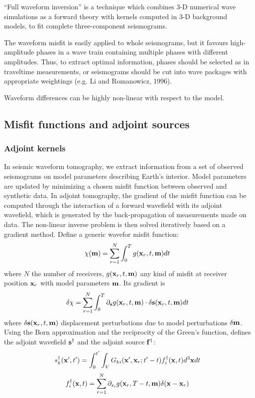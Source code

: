  ``Full waveform inversion'' is a technique
which combines 3-D numerical wave simulations as a forward theory
with \Frechet kernels computed in 3-D background models,
to fit complete three-component seismograms.

 The waveform misfit is easily applied to whole seismograms,
but it favours high-amplitude phases in a wave train
containing multiple phases with different amplitudes.
Thus, to extract optimal information, phases should be selected as in traveltime measurements,
or seismograms should be cut into wave packages with appropriate weightings
(e.g. Li and Romanowicz, 1996).

Waveform differences can be highly non-linear with respect to the model.

\subsection{Misfit functions and adjoint sources}
\subsubsection{Adjoint kernels}
 In seismic waveform tomography, we extract information from
a set of observed seismograms on model parameters describing Earth's interior.
Model parameters are updated by minimizing a chosen misfit function
between observed and synthetic data.
In adjoint tomography, the gradient of the misfit function can be computed
through the interaction of a forward wavefield with its adjoint wavefield,
which is generated by the back-propagation of measurements made on data.
The non-linear inverse problem is then solved iteratively based on a gradient method.
Define a generic wavefor misfit function:
\[ \chi(\mathbf{m})=\sum_{r=1}^N\int_0^Tg(\mathbf{x}_r,t,\mathbf{m})dt \]
where $N$ the number of receivers, $g(\mathbf{x}_r,t,\mathbf{m})$ any kind of misfit
at receiver position $\mathbf{x}_r$ with model parameters $\mathbf{m}$.
Its gradient is
\[ \delta\chi=\sum_{r=1}^N\int_0^T\partial_{\mathbf{s}}g(\mathbf{x}_r,t,\mathbf{m})\cdot\delta\mathbf{s}(\mathbf{x}_r,t,\mathbf{m})dt \]
where $\delta\mathbf{s}(\mathbf{x}_r,t,\mathbf{m})$ displacement perturbations
due to model perturbations $\delta\mathbf{m}$.
Using the Born approximation and the reciprocity of the Green's function,
defines the adjoint wavefield $\mathbf{s}^\dagger$ and the adjoint source $\mathbf{f}^\dagger$:
\[ s_k^\dagger(\mathbf{x}',t')=\int_0^{t'}\int_VG_{ki}(\mathbf{x}',\mathbf{x}_r;t'-t)f_i^\dagger(\mathbf{x},t)d^3\mathbf{x}dt \]
\[ f_i^\dagger(\mathbf{x},t)=\sum_{r=1}^N\partial_{s_i}g(\mathbf{x}_r,T-t,\mathbf{m})\delta(\mathbf{x}-\mathbf{x}_r) \]

